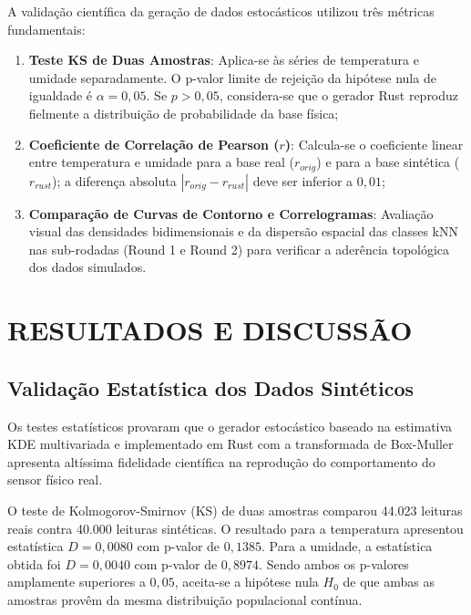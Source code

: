 \documentclass[
	12pt,
	openright,
	oneside,
	a4paper,
	english,
	brazil
	]{abntex2}
\begin{document}
A validação científica da geração de dados estocásticos utilizou três métricas fundamentais:
\begin{enumerate}
    \item \textbf{Teste KS de Duas Amostras}: Aplica-se às séries de temperatura e umidade separadamente. O p-valor limite de rejeição da hipótese nula de igualdade é $\alpha = 0,05$. Se $p > 0,05$, considera-se que o gerador Rust reproduz fielmente a distribuição de probabilidade da base física;
    \item \textbf{Coeficiente de Correlação de Pearson ($r$)}: Calcula-se o coeficiente linear entre temperatura e umidade para a base real ($r_{orig}$) e para a base sintética ($r_{rust}$); a diferença absoluta $|r_{orig} - r_{rust}|$ deve ser inferior a $0,01$;
    \item \textbf{Comparação de Curvas de Contorno e Correlogramas}: Avaliação visual das densidades bidimensionais e da dispersão espacial das classes kNN nas sub-rodadas (Round 1 e Round 2) para verificar a aderência topológica dos dados simulados.
\end{enumerate}

\chapter{RESULTADOS E DISCUSSÃO}
\label{cap:resultados}

\section{Validação Estatística dos Dados Sintéticos}

Os testes estatísticos provaram que o gerador estocástico baseado na estimativa KDE multivariada e implementado em Rust com a transformada de Box-Muller apresenta altíssima fidelidade científica na reprodução do comportamento do sensor físico real.

O teste de Kolmogorov-Smirnov (KS) \cite{massey1951ks} de duas amostras comparou 44.023 leituras reais contra 40.000 leituras sintéticas. O resultado para a temperatura apresentou estatística $D = 0,0080$ com p-valor de $0,1385$. Para a umidade, a estatística obtida foi $D = 0,0040$ com p-valor de $0,8974$. Sendo ambos os p-valores amplamente superiores a $0,05$, aceita-se a hipótese nula $H_0$ de que ambas as amostras provêm da mesma distribuição populacional contínua.
\end{document}
